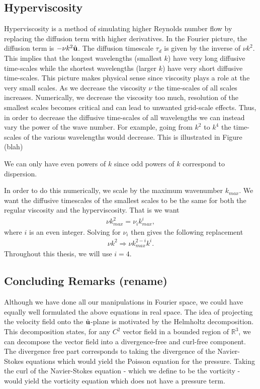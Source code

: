 \subsection{Hyperviscosity}
Hyperviscosity is a method of simulating higher Reynolds number flow by replacing the diffusion term with higher derivatives. In the Fourier picture, the diffusion term is $-\nu k^{2}\hat{\textbf{u}}$. The diffusion timescale $\tau_{d}$ is given by the inverse of $\nu k^{2}$. This implies that the longest wavelengths (smallest $k$) have very long diffusive time-scales while the shortest wavelengths (larger $k$) have very short diffusive time-scales. This picture makes physical sense since viscosity plays a role at the very small scales. As we decrease the viscosity $\nu$ the time-scales of all scales increases. Numerically, we decrease the viscosity too much, resolution of the smallest scales becomes critical and can lead to unwanted grid-scale effects. Thus, in order to decrease the diffusive time-scales of all wavelengths we can instead vary the power of the wave number. For example, going from $k^{2}$ to $k^{4}$ the time-scales of the various wavelengths would decrease. This is illustrated in Figure (blah)

We can only have even powers of $k$ since odd powers of $k$ correspond to dispersion. 

In order to do this numerically, we scale by the maximum wavenumber $k_{max}$. We want the diffusive timescales of the smallest scales to be the same for both the regular viscosity and the hyperviscosity. That is we want
\begin{align}
\nu k_{max}^{2} = \nu_{i}k_{max}^{i},
\end{align}
where $i$ is an even integer. Solving for $\nu_{i}$ then gives the following replacement
\begin{align}
\nu k^{2} \Rightarrow \nu k_{max}^{2-i}k^{i}.
\end{align}
Throughout this thesis, we will use $i=4$. 

\subsection{Concluding Remarks (rename)}
Although we have done all our manipulations in Fourier space, we could have equally well formulated the above equations in real space. The idea of projecting the velocity field onto the $\hat{\textbf{u}}$-plane is motivated by the Helmholtz decomposition. This decomposition states, for any $C^{2}$ vector field in a bounded region of $\mathbb{R}^{3}$, we can decompose the vector field into a divergence-free and curl-free component. The divergence free part corresponds to taking the divergence of the Navier-Stokes equations which would yield the Poisson equation for the pressure. Taking the curl of the Navier-Stokes equation - which we define to be the vorticity - would yield the vorticity equation which does not have a pressure term.
